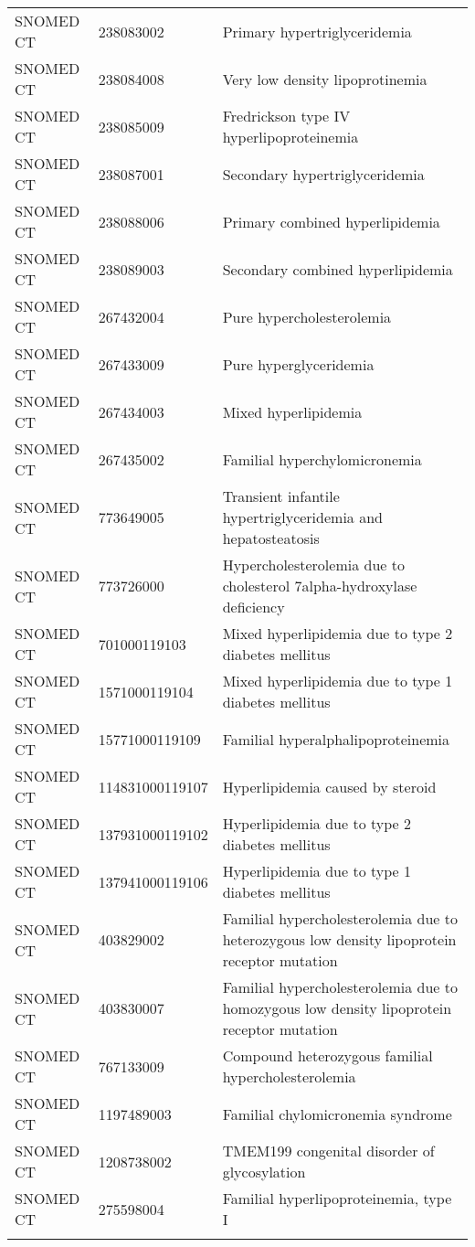 \begin{longtable}{p{}p{}p{}}
  SNOMED CT & 238083002 & Primary hypertriglyceridemia \\ 
  SNOMED CT & 238084008 & Very low density lipoprotinemia \\ 
  SNOMED CT & 238085009 & Fredrickson type IV hyperlipoproteinemia \\ 
  SNOMED CT & 238087001 & Secondary hypertriglyceridemia \\ 
  SNOMED CT & 238088006 & Primary combined hyperlipidemia \\ 
  SNOMED CT & 238089003 & Secondary combined hyperlipidemia \\ 
  SNOMED CT & 267432004 & Pure hypercholesterolemia \\ 
  SNOMED CT & 267433009 & Pure hyperglyceridemia \\ 
  SNOMED CT & 267434003 & Mixed hyperlipidemia \\ 
  SNOMED CT & 267435002 & Familial hyperchylomicronemia \\ 
  SNOMED CT & 773649005 & Transient infantile hypertriglyceridemia and hepatosteatosis \\ 
  SNOMED CT & 773726000 & Hypercholesterolemia due to cholesterol 7alpha-hydroxylase deficiency \\ 
  SNOMED CT & 701000119103 & Mixed hyperlipidemia due to type 2 diabetes mellitus \\ 
  SNOMED CT & 1571000119104 & Mixed hyperlipidemia due to type 1 diabetes mellitus \\ 
  SNOMED CT & 15771000119109 & Familial hyperalphalipoproteinemia \\ 
  SNOMED CT & 114831000119107 & Hyperlipidemia caused by steroid \\ 
  SNOMED CT & 137931000119102 & Hyperlipidemia due to type 2 diabetes mellitus \\ 
  SNOMED CT & 137941000119106 & Hyperlipidemia due to type 1 diabetes mellitus \\ 
  SNOMED CT & 403829002 & Familial hypercholesterolemia due to heterozygous low density lipoprotein receptor mutation \\ 
  SNOMED CT & 403830007 & Familial hypercholesterolemia due to homozygous low density lipoprotein receptor mutation \\ 
  SNOMED CT & 767133009 & Compound heterozygous familial hypercholesterolemia \\ 
  SNOMED CT & 1197489003 & Familial chylomicronemia syndrome \\ 
  SNOMED CT & 1208738002 & TMEM199 congenital disorder of glycosylation \\ 
  SNOMED CT & 275598004 & Familial hyperlipoproteinemia, type I \\ 
  \hline
\label{tab:codes_hyperlipidemia}
\end{longtable}
